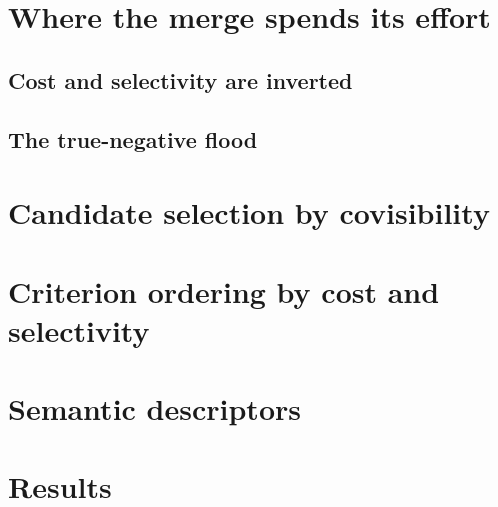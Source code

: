 \section{Where the merge spends its effort}
\label{sec:fus_scope}

\subsection{Cost and selectivity are inverted}
\label{sec:fm_cost_selectivity}

\subsection{The true-negative flood}
\label{sec:fm_tn_flood}

\section{Candidate selection by covisibility}
\label{sec:assoc_candidates}

\section{Criterion ordering by cost and selectivity}
\label{sec:assoc_ordering}

\section{Semantic descriptors}
\label{sec:assoc_descriptors}

\section{Results}
\label{sec:fus_results}
